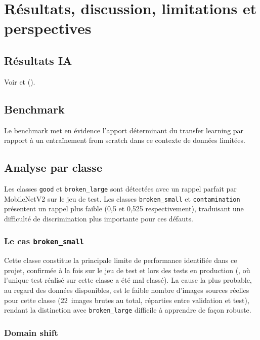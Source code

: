 \chapter{R\'esultats, discussion, limitations et perspectives}
\label{ch:discussion}

\section{R\'esultats IA}

Voir  et  ().

\section{Benchmark}

Le benchmark met en \'evidence l'apport d\'eterminant du transfer learning par rapport \`a un entra\^inement from scratch dans ce contexte de donn\'ees limit\'ees.

\section{Analyse par classe}

Les classes \texttt{good} et \texttt{broken\_large} sont d\'etect\'ees avec un rappel parfait par MobileNetV2 sur le jeu de test. Les classes \texttt{broken\_small} et \texttt{contamination} pr\'esentent un rappel plus faible (0,5 et 0,525 respectivement), traduisant une difficult\'e de discrimination plus importante pour ces d\'efauts.

\subsection*{Le cas \texttt{broken\_small}}

Cette classe constitue la principale limite de performance identifi\'ee dans ce projet, confirm\'ee \`a la fois sur le jeu de test et lors des tests en production (, o\`u l'unique test r\'ealis\'e sur cette classe a \'et\'e mal class\'e). La cause la plus probable, au regard des donn\'ees disponibles, est le faible nombre d'images sources r\'eelles pour cette classe (22~images brutes au total, r\'eparties entre validation et test), rendant la distinction avec \texttt{broken\_large} difficile \`a apprendre de fa\c{c}on robuste.

\subsection*{Domain shift}

